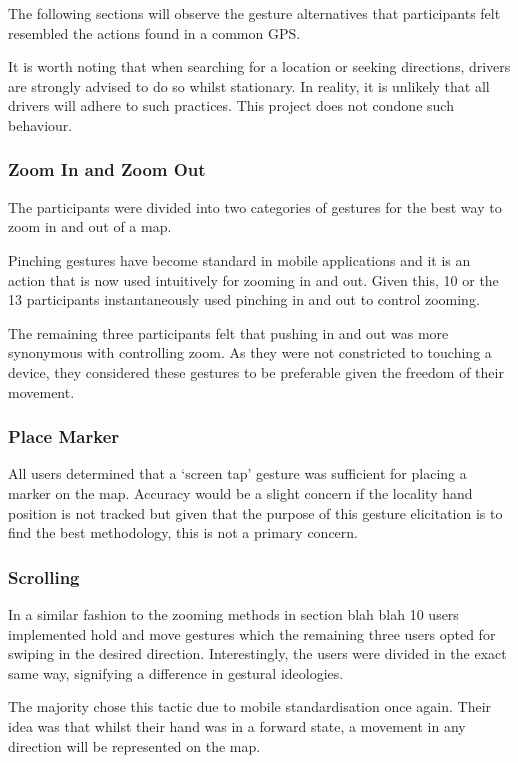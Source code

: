 \documentclass{l4proj}
\begin{document}
The following sections will observe the gesture alternatives that participants felt resembled the actions found in a common GPS.

It is worth noting that when searching for a location or seeking directions, drivers are strongly advised to do so whilst stationary. In reality, it is unlikely that all drivers will adhere to such practices. This project does not condone such behaviour.

\subsubsection{Zoom In and Zoom Out}
\vspace{-3mm}
The participants were divided into two categories of gestures for the best way to zoom in and out of a map.

Pinching gestures have become standard in mobile applications and it is an action that is now used intuitively for zooming in and out. Given this, 10 or the 13 participants instantaneously used pinching in and out to control zooming. 

The remaining three participants felt that pushing in and out was more synonymous with controlling zoom. As they were not constricted to touching a device, they considered these gestures to be preferable given the freedom of their movement.

\subsubsection{Place Marker}
\vspace{-3mm}
All users determined that a `screen tap' gesture was sufficient for placing a marker on the map. Accuracy would be a slight concern if the locality hand position is not tracked but given that the purpose of this gesture elicitation is to find the best methodology, this is not a primary concern.

\subsubsection{Scrolling}
\vspace{-3mm}
In a similar fashion to the zooming methods in section blah blah 10 users implemented hold and move gestures which the remaining three users opted for swiping in the desired direction. Interestingly,  the users were divided in the exact same way, signifying a difference in gestural ideologies.

The majority chose this tactic due to mobile standardisation once again. Their idea was that whilst their hand was in a forward state, a movement in any direction will be represented on the map. 
\end{document}
